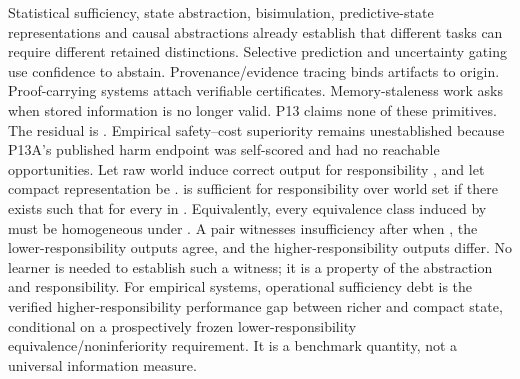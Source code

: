 \markdownRendererDocumentBegin
\markdownRendererSectionBegin
{}\markdownRendererInterblockSeparator
{}Statistical sufficiency, state abstraction, bisimulation, predictive-state representations and causal abstractions already establish that different tasks can require different retained distinctions. Selective prediction and uncertainty gating use confidence to abstain. Provenance/evidence tracing binds artifacts to origin. Proof-carrying systems attach verifiable certificates. Memory-staleness work asks when stored information is no longer valid. P13 claims none of these primitives.\markdownRendererInterblockSeparator
{}The residual is . Empirical safety–cost superiority remains unestablished because P13A's published harm endpoint was self-scored and had no reachable opportunities.\markdownRendererInterblockSeparator
{}Let raw world  induce correct output  for responsibility , and let compact representation be .\markdownRendererInterblockSeparator
{}\markdownRendererSectionBegin
{}\markdownRendererInterblockSeparator
{} is sufficient for responsibility  over world set  if there exists  such that  for every  in . Equivalently, every equivalence class induced by  must be homogeneous under .\markdownRendererInterblockSeparator
{}
\markdownRendererSectionEnd \markdownRendererSectionBegin
{}\markdownRendererInterblockSeparator
{}A pair  witnesses insufficiency after  when , the lower-responsibility outputs agree, and the higher-responsibility outputs differ. No learner is needed to establish such a witness; it is a property of the abstraction and responsibility.\markdownRendererInterblockSeparator
{}For empirical systems, operational sufficiency debt is the verified higher-responsibility performance gap between richer and compact state, conditional on a prospectively frozen lower-responsibility equivalence/noninferiority requirement. It is a benchmark quantity, not a universal information measure.
\markdownRendererSectionEnd 
\markdownRendererSectionEnd \markdownRendererDocumentEnd